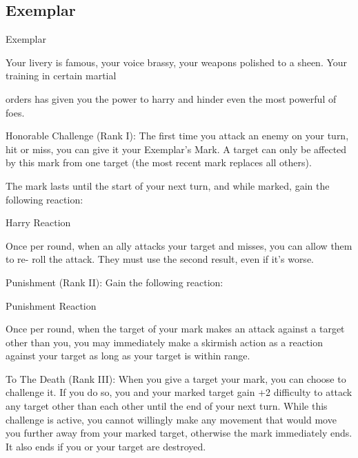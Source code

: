 \subsection{Exemplar}

                                                  Exemplar  

Your livery is famous, your voice brassy, your weapons polished to a sheen. Your training in certain martial  

orders has given you the power to harry and hinder even the most powerful of foes.  

Honorable Challenge (Rank I): The first time you attack an enemy on your turn, hit or miss, you  
can give it your Exemplar’s Mark. A target can only be affected by this mark from one target (the  
most recent mark replaces all others).
 
The mark lasts until the start of your next turn, and while marked, gain the following reaction:
 
         Harry  
         Reaction
 
         Once per round, when an ally attacks your target and misses, you can allow them to re- 
         roll the attack. They must use the second result, even if it’s worse.
 
Punishment (Rank II): Gain the following reaction:
 
	        Punishment  
	        Reaction
 
         Once per round, when the target of your mark makes an attack against a target other than  
         you, you may immediately make a skirmish action as a reaction against your target as  
         long as your target is within range.
 
To The Death (Rank III): When you give a target your mark, you can choose to challenge it. If  
you do so, you and your marked target gain +2 difficulty to attack any target other than each  
other until the end of your next turn. While this challenge is active, you cannot willingly make any  
movement that would move you further away from your marked target, otherwise the mark  
immediately ends. It also ends if you or your target are destroyed.